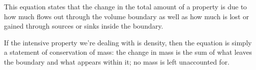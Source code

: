 This equation states that the change in the total amount of a property is due to how much flows out through the volume boundary as well as how much is lost or gained through sources or sinks inside the boundary.


If the intensive property we're dealing with is density, then the equation is simply a statement of conservation of mass: the change in mass is the sum of what leaves the boundary and what appears within it; no mass is left unaccounted for.


% 

% 
% 
% 
% 
% 
% 
% 
% 
% 
